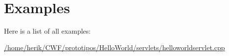 \section{Examples}
Here is a list of all examples\+:\begin{DoxyCompactItemize}
\item 
\hyperlink{_2home_2herik_2_c_w_f_2prototipos_2_hello_world_2servlets_2helloworldservlet_8cpp-example}{/home/herik/\+C\+W\+F/prototipos/\+Hello\+World/servlets/helloworldservlet.\+cpp}
\end{DoxyCompactItemize}
